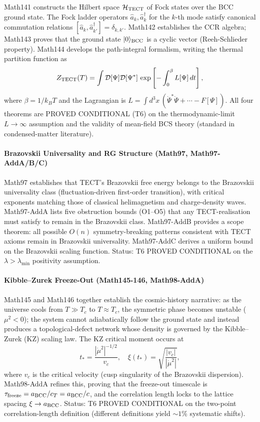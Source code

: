 Math141 constructs the Hilbert space $\mathcal{H}_{\rm TECT}$ of Fock states over
the BCC ground state. The Fock ladder operators $\hat{a}_k, \hat{a}^\dagger_k$ for
the $k$-th mode satisfy canonical commutation relations
$[\hat{a}_k, \hat{a}^\dagger_{k'}] = \delta_{k,k'}$. Math142 establishes the CCR
algebra; Math143 proves that the ground state $|0\rangle_{\rm BCC}$ is a cyclic
vector (Reeh-Schlieder property). Math144 develops the path-integral formalism,
writing the thermal partition function as
\begin{equation}
Z_{\rm TECT}(T) = \int \mathcal{D}[\Psi] \mathcal{D}[\Psi^*] \,\exp\left[
-\int_0^{\beta} L[\Psi] \, dt \right],
\end{equation}
where $\beta = 1/k_B T$ and the Lagrangian is $L = \int d^3x \, (\dot{\Psi}^* \dot{\Psi}
+ \cdots - F[\Psi])$. All four theorems are PROVED CONDITIONAL (T6) on the
thermodynamic-limit $L \to \infty$ assumption and the validity of mean-field
BCS theory (standard in condensed-matter literature).

\paragraph{Brazovskii Universality and RG Structure (Math97, Math97-AddA/B/C)}

Math97 establishes that TECT's Brazovskii free energy belongs to the Brazovskii
universality class (fluctuation-driven first-order transition), with critical
exponents matching those of classical helimagnetism and charge-density waves.
Math97-AddA lists five obstruction bounds (O1--O5) that any TECT-realisation
must satisfy to remain in the Brazovskii class. Math97-AddB provides a scope
theorem: all possible $O(n)$ symmetry-breaking patterns consistent with TECT
axioms remain in Brazovskii universality. Math97-AddC derives a uniform bound
on the Brazovskii scaling function. Status: T6 PROVED CONDITIONAL on the
$\lambda > \lambda_{\min}$ positivity assumption.

\paragraph{Kibble--Zurek Freeze-Out (Math145-146, Math98-AddA)}

Math145 and Math146 together establish the cosmic-history narrative: as the
universe cools from $T \gg T_c$ to $T \approx T_c$, the symmetric phase becomes
unstable ($\mu^2 < 0$); the system cannot adiabatically follow the ground state
and instead produces a topological-defect network whose density is governed by
the Kibble--Zurek (KZ) scaling law. The KZ critical moment occurs at
\begin{equation}
t_* = \frac{|\dot{\mu}^2|^{-1/2}}{v_c}, \quad
\xi(t_*) = \sqrt{\frac{|v_c|}{|\dot{\mu}^2|}},
\end{equation}
where $v_c$ is the critical velocity (cusp singularity of the Brazovskii dispersion).
Math98-AddA refines this, proving that the freeze-out timescale is
$\tau_{\rm freeze} = a_{\rm BCC} / c_T = a_{\rm BCC} / c$, and the correlation
length locks to the lattice spacing $\xi \to a_{\rm BCC}$. Status: T6
PROVED CONDITIONAL on the two-point correlation-length definition (different
definitions yield $\sim 1\%$ systematic shifts).

